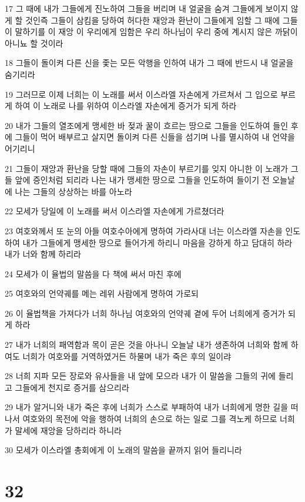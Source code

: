 \par 17 그 때에 내가 그들에게 진노하여 그들을 버리며 내 얼굴을 숨겨 그들에게 보이지 않게 할 것인즉 그들이 삼킴을 당하여 허다한 재앙과 환난이 그들에게 임할 그 때에 그들이 말하기를 이 재앙 이 우리에게 임함은 우리 하나님이 우리 중에 계시지 않은 까닭이 아니뇨 할 것이라
\par 18 그들이 돌이켜 다른 신을 좇는 모든 악행을 인하여 내가 그 때에 반드시 내 얼굴을 숨기리라
\par 19 그러므로 이제 너희는 이 노래를 써서 이스라엘 자손에게 가르쳐서 그 입으로 부르게 하여 이 노래로 나를 위하여 이스라엘 자손에게 증거가 되게 하라
\par 20 내가 그들의 열조에게 맹세한 바 젖과 꿀이 흐르는 땅으로 그들을 인도하여 들인 후에 그들이 먹어 배부르고 살지면 돌이켜 다른 신들을 섬기며 나를 멸시하여 내 언약을 어기리니
\par 21 그들이 재앙과 환난을 당할 때에 그들의 자손이 부르기를 잊지 아니한 이 노래가 그들 앞에 증인처럼 되리라 나는 내가 맹세한 땅으로 그들을 인도하여 들이기 전 오늘날에 나는 그들의 상상하는 바를 아노라
\par 22 모세가 당일에 이 노래를 써서 이스라엘 자손에게 가르쳤더라
\par 23 여호와께서 또 눈의 아들 여호수아에게 명하여 가라사대 너는 이스라엘 자손을 인도하여 내가 그들에게 맹세한 땅으로 들어가게 하리니 마음을 강하게 하고 담대히 하라 내가 너와 함께 하리라
\par 24 모세가 이 율법의 말씀을 다 책에 써서 마친 후에
\par 25 여호와의 언약궤를 메는 레위 사람에게 명하여 가로되
\par 26 이 율법책을 가져다가 너희 하나님 여호와의 언약궤 곁에 두어 너희에게 증거가 되게 하라
\par 27 내가 너희의 패역함과 목이 곧은 것을 아나니 오늘날 내가 생존하여 너희와 함께 하여도 너희가 여호와를 거역하였거든 하물며 내가 죽은 후의 일이랴
\par 28 너희 지파 모든 장로와 유사들을 내 앞에 모으라 내가 이 말씀을 그들의 귀에 들리고 그들에게 천지로 증거를 삼으리라
\par 29 내가 알거니와 내가 죽은 후에 너희가 스스로 부패하여 내가 너희에게 명한 길을 떠나서 여호와의 목전에 악을 행하여 너희의 손으로 하는 일로 그를 격노케 하므로 너희가 말세에 재앙을 당하리라 하니라
\par 30 모세가 이스라엘 총회에게 이 노래의 말씀을 끝까지 읽어 들리니라

\chapter{32}

